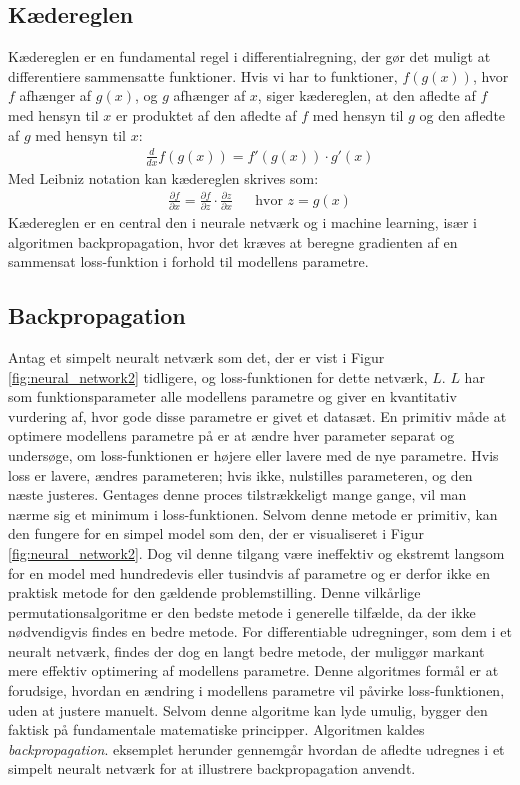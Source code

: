 \documentclass{article}
\newcommand{\figureref}[1]{Figur \ref{#1}}
\begin{document}
\subsection{Kædereglen}
Kædereglen er en fundamental regel i differentialregning, der gør det muligt at differentiere sammensatte funktioner. Hvis vi har to funktioner, $f(g(x))$, hvor $f$ afhænger af $g(x)$, og $g$ afhænger af $x$, siger kædereglen, at den afledte af $f$ med hensyn til $x$ er produktet af den afledte af $f$ med hensyn til $g$ og den afledte af $g$ med hensyn til $x$:
\begin{align}
  \frac{d}{dx} f(g(x)) = f'(g(x)) \cdot g'(x)
\end{align}
Med Leibniz notation kan kædereglen skrives som:
\begin{align}
  \frac{\partial f}{\partial x} = \frac{\partial f}{\partial z} \cdot \frac{\partial z}{\partial x}
  &&
  \text{hvor } z = g(x)
\end{align}
Kædereglen er en central den i neurale netværk og i machine learning, især i algoritmen backpropagation, hvor det kræves at beregne gradienten af en sammensat loss-funktion i forhold til modellens parametre. \parencite{Kirsanov_2024}
\subsection{Backpropagation}
Antag et simpelt neuralt netværk som det, der er vist i \figureref{fig:neural_network2} tidligere, og loss-funktionen for dette netværk, $L$. $L$ har som funktionsparameter alle modellens parametre og giver en kvantitativ vurdering af, hvor gode disse parametre er givet et datasæt. En primitiv måde at optimere modellens parametre på er at ændre hver parameter separat og undersøge, om loss-funktionen er højere eller lavere med de nye parametre. Hvis loss er lavere, ændres parameteren; hvis ikke, nulstilles parameteren, og den næste justeres. Gentages denne proces tilstrækkeligt mange gange, vil man nærme sig et minimum i loss-funktionen. Selvom denne metode er primitiv, kan den fungere for en simpel model som den, der er visualiseret i \figureref{fig:neural_network2}. Dog vil denne tilgang være ineffektiv og ekstremt langsom for en model med hundredevis eller tusindvis af parametre og er derfor ikke en praktisk metode for den gældende problemstilling. Denne vilkårlige permutationsalgoritme er den bedste metode i generelle tilfælde, da der ikke nødvendigvis findes en bedre metode. \parencite{Kirsanov_2024} For differentiable udregninger, som dem i et neuralt netværk, findes der dog en langt bedre metode, der muliggør markant mere effektiv optimering af modellens parametre. Denne algoritmes formål er at forudsige, hvordan en ændring i modellens parametre vil påvirke loss-funktionen, uden at justere manuelt. Selvom denne algoritme kan lyde umulig, bygger den faktisk på fundamentale matematiske principper. Algoritmen kaldes \textit{backpropagation}. \parencite{Kirsanov_2024, Nielsen_2019b, Sanderson_2017} eksemplet herunder gennemgår hvordan de afledte udregnes i et simpelt neuralt netværk for at illustrere backpropagation anvendt.
\end{document}
